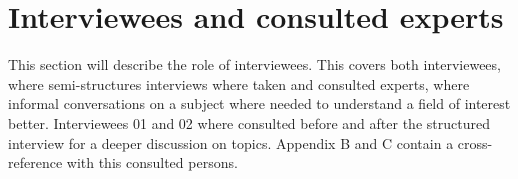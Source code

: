 
\appendix 
\chapter{Interviewees and consulted experts} \label{Appendix A} %
This section will describe the role of interviewees. This covers both interviewees, where semi-structures interviews where taken and consulted experts, where informal conversations on a subject where needed to understand a field of interest better. Interviewees 01 and 02 where consulted before and after the structured interview for a deeper discussion on topics. 
Appendix B and C contain a cross-reference with this consulted persons. 

